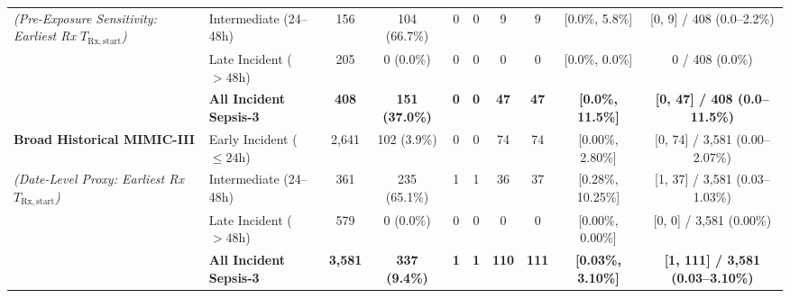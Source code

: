 \documentclass[10pt,twocolumn,a4paper]{article}
\begin{document}
\begin{table}[t]
{\begin{tabular*}{\textwidth}{@{\extracolsep{\fill}}llcccccccc@{}}
\textit{(Pre-Exposure Sensitivity: Earliest Rx $T_{\mathrm{Rx,start}}$)} & Intermediate (24--48h) & 156 & 104 (66.7\%) & 0 & 0 & 9 & 9 & [0.0\%, 5.8\%] & [0, 9] / 408 (0.0--2.2\%) \\
 & Late Incident ($>48\text{h}$) & 205 & 0 (0.0\%) & 0 & 0 & 0 & 0 & [0.0\%, 0.0\%] & 0 / 408 (0.0\%) \\
 & \textbf{All Incident Sepsis-3} & \textbf{408} & \textbf{151 (37.0\%)} & \textbf{0} & \textbf{0} & \textbf{47} & \textbf{47} & \textbf{[0.0\%, 11.5\%]} & \textbf{[0, 47] / 408 (0.0--11.5\%)} \\
\midrule
\textbf{Broad Historical MIMIC-III} & Early Incident ($\le 24\text{h}$) & 2,641 & 102 (3.9\%) & 0 & 0 & 74 & 74 & [0.00\%, 2.80\%] & [0, 74] / 3,581 (0.00--2.07\%) \\
\textit{(Date-Level Proxy: Earliest Rx $T_{\mathrm{Rx,start}}$)} & Intermediate (24--48h) & 361 & 235 (65.1\%) & 1 & 1 & 36 & 37 & [0.28\%, 10.25\%] & [1, 37] / 3,581 (0.03--1.03\%) \\
 & Late Incident ($>48\text{h}$) & 579 & 0 (0.0\%) & 0 & 0 & 0 & 0 & [0.00\%, 0.00\%] & [0, 0] / 3,581 (0.00\%) \\
 & \textbf{All Incident Sepsis-3} & \textbf{3,581} & \textbf{337 (9.4\%)} & \textbf{1} & \textbf{1} & \textbf{110} & \textbf{111} & \textbf{[0.03\%, 3.10\%]} & \textbf{[1, 111] / 3,581 (0.03--3.10\%)} \\
\bottomrule
\end{tabular*}}
\end{table}
\end{document}
